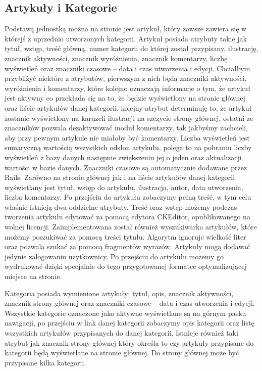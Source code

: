 \documentclass[openright]{xmgr}
\begin{document}
\subsection{Artykuły i Kategorie}
Podstawą jednostką można na stronie jest artykuł, który zawsze zawiera się w którejś z uprzednio utworzonych kategorii. Artykuł posiada atrybuty takie jak tytuł, wstęp, treść główną, numer kategorii do której został przypisany, ilustrację, znacznik aktywności, znacznik wyróżnienia, znacznik komentarzy, liczbę wyświetleń oraz znaczniki czasowe – data i czas utworzenia i edycji. Chciałbym przybliżyć niektóre z atrybutów, pierwszym z nich będą znaczniki aktywności, wyróżnienia i komentarzy, które kolejno oznaczają informacje o tym, że artykuł jest aktywny co przekłada się na to, że będzie wyświetlony na stronie głównej oraz liście artykułów danej kategorii, kolejny atrybut determinuję to, że artykuł zostanie wyświetlony na karuzeli ilustracji na szczycie strony głównej, ostatni ze znaczników pozwala dezaktywować moduł komentarzy, tak jakbyśmy zachcieli, aby przy pewnym artykule nie miałoby być komentarzy. Liczba wyświetleń jest sumaryczną wartością wszystkich odsłon artykułu, polega to na pobraniu liczby wyświetleń z bazy danych następnie zwiększeniu jej o jeden oraz aktualizacji wartości w bazie danych. Znaczniki czasowe są automatycznie dodawane przez Rails. Zarówno na stronie głównej jak i na liście artykułów danej kategorii wyświetlany jest tytuł, wstęp do artykułu, ilustracja, autor, data utworzenia, liczba komentarzy. Po przejściu do artykułu zobaczymy pełną treść, w tym celu właśnie istnieją dwa oddzielne atrybuty. Treść oraz wstęp możemy podczas tworzenia artykułu edytować za pomocą edytora CKEditor, opublikowanego na wolnej licencji. Zaimplementowana został również wyszukiwarka artykułów, które możemy poszukiwać za pomocą treści tytułu. Algorytm ignoruje wielkość liter oraz pozwala szukać za pomocą fragmentów wyrazów. Artykuły mogą dodawać jedynie zalogowaniu użytkownicy. Po przejściu do artykułu możemy go wydrukować dzięki specjalnie do tego przygotowanej formatce optymalizującej miejsce na stronie. 

Kategoria posiada wymienione artykuły: tytuł, opis, znacznik aktywności, znacznik strony głównej oraz znaczniki czasowe – data i czas utworzenia i edycji. Wszystkie kategorie oznaczone jako aktywne wyświetlane są na górnym pasku nawigacji, po przejściu w link danej kategorii zobaczymy opis kategorii oraz listę wszystkich artykułów przypisanych do danej kategorii. Istnieje również taki atrybut jak znacznik strony głównej który określa to czy artykuły przypisane do kategorii będą wyświetlane na stronie głównej. Do strony głównej może być przypisane kilka kategorii. 
\end{document}
